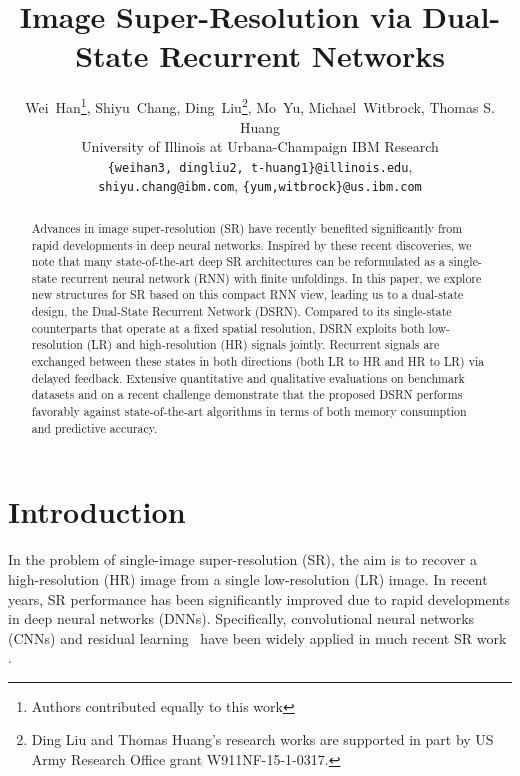 \documentclass[10pt,twocolumn,letterpaper]{article}
\newcommand{\algname}{DSRN }
\newcommand{\algnamens}{DSRN}
\newcommand*\samethanks[1][\value{footnote}]{\footnotemark[#1]}
\begin{document}
\title{Image Super-Resolution via Dual-State Recurrent Networks}

\author{Wei~Han\thanks{Authors contributed equally to this work},  Shiyu~Chang\samethanks,  Ding~Liu\thanks{Ding Liu and Thomas Huang's research works are supported
in part by US Army Research Office grant W911NF-15-1-0317.}, Mo~Yu, Michael~Witbrock,  Thomas S. Huang\samethanks\\
University of Illinois at Urbana-Champaign  IBM Research
\\
{\tt\small \{weihan3, dingliu2, t-huang1\}@illinois.edu}, \\
{\tt\small shiyu.chang@ibm.com}, \tt\small \{yum,witbrock\}@us.ibm.com}
\maketitle
\begin{abstract}
Advances in image super-resolution (SR) have recently benefited significantly from rapid developments in deep neural networks.  Inspired by these recent discoveries, we note that many state-of-the-art deep SR architectures can be reformulated as a single-state recurrent neural network (RNN) with finite unfoldings.   In this paper, we explore new structures for SR based on this compact RNN view, leading us to a dual-state design, the Dual-State Recurrent Network (\algnamens).  Compared to its single-state counterparts that operate at a fixed spatial resolution, \algname exploits both low-resolution (LR) and high-resolution (HR) signals jointly.   Recurrent signals are exchanged between these states in both directions (both LR to HR and HR to LR) via delayed feedback.  Extensive quantitative and qualitative evaluations on benchmark datasets and on a recent challenge demonstrate that the proposed \algname performs favorably against state-of-the-art algorithms in terms of both memory consumption and predictive accuracy. 






\end{abstract}

\section{Introduction}
In the problem of single-image super-resolution (SR), the aim is to recover a high-resolution (HR) image from a single low-resolution (LR) image.   In recent years, SR performance has been significantly improved due to rapid developments in deep neural networks (DNNs).  Specifically, convolutional neural networks (CNNs) and residual learning~\cite{he2016deep} have been widely applied in much recent SR work \cite{dong2014learning, fan2017balanced, kim2016accurate, kim2016deeply, lai2017deep, lim2017enhanced, tai2017image, tong2017image}.  
\end{document}
